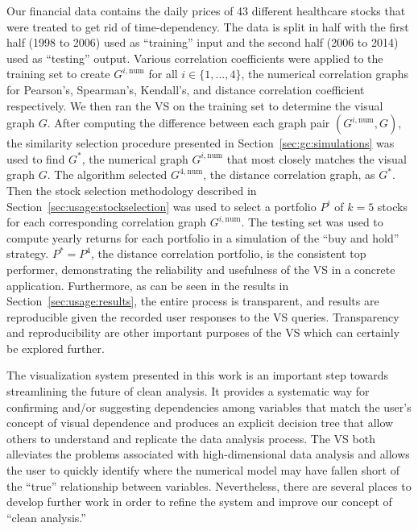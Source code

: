 Our financial data contains the daily prices of 43 different healthcare 
stocks that were treated to get rid of time-dependency. The data is split in 
half with the first half (1998 to 2006) used as ``training'' input and the 
second half (2006 to 2014) used as ``testing'' output. Various correlation 
coefficients were applied to the training set to create $G^{i,\text{num}}$ for 
all $i \in \{1,...,4\}$, the numerical correlation graphs for Pearson's, 
Spearman's, Kendall's, and distance correlation coefficient respectively. We 
then ran the VS on the training set to determine the visual graph $G$. After 
computing the difference between each graph pair $(G^{i,\text{num}},G)$, the 
similarity selection procedure presented in 
Section~\ref{sec:gc:simulations} was used to find $G^*$, the numerical 
graph $G^{i,\text{num}}$ that most closely matches the visual graph $G$. The 
algorithm selected $G^{4,\text{num}}$, the distance correlation graph, as 
$G^*$. Then the stock selection methodology described in 
Section~\ref{sec:usage:stockselection} was used to select a portfolio $P^i$ 
of $k = 5$ stocks for each corresponding correlation graph $G^{i,\text{num}}$. 
The testing set was used to compute yearly returns for each portfolio in a 
simulation of the ``buy and hold'' strategy. $P^* = P^4$, the 
distance correlation portfolio, is the consistent top performer, demonstrating 
the reliability and usefulness of the VS in a concrete application. 
Furthermore, as can be seen 
in the results in Section~\ref{sec:usage:results}, the entire process is  
transparent, and results are reproducible given the recorded user responses 
to the VS queries. Transparency and reproducibility are 
other important purposes of the VS which can certainly be explored further.

The visualization system presented in this work is an important step towards
streamlining the future of clean analysis. It provides a systematic way for 
confirming and/or suggesting dependencies among variables that match the user's 
concept of visual dependence and produces an explicit decision tree that allow 
others to understand and replicate the data analysis process. The VS both 
alleviates the problems associated with high-dimensional data analysis and 
allows the user to quickly identify where the numerical model may have fallen 
short of the ``true'' relationship between variables. Nevertheless, there are 
several places to develop further work in order to refine the system and 
improve our concept of ``clean analysis.''